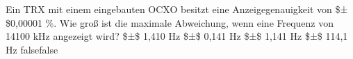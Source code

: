     {Ein TRX mit einem eingebauten OCXO besitzt eine Anzeigegenauigkeit von \$±\$0,00001 \%. Wie groß ist die maximale Abweichung, wenn eine Frequenz von 14100 kHz angezeigt wird?}
    {\$±\$ 1,410 Hz}
    {\$±\$ 0,141 Hz}
    {\$±\$ 1,141 Hz}
    {\$±\$ 114,1 Hz}
    {false}{false}